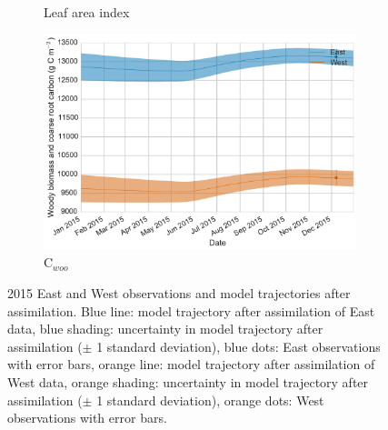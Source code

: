 \documentclass[11pt]{article}
\begin{document}
\begin{figure}[ht]
\begin{subfigure}[b]{0.49\textwidth}
        \caption{Leaf area index}
        \label{fig:lai}
    \end{subfigure}
    \begin{subfigure}[b]{0.49\textwidth}
        \includegraphics[width=\textwidth]{c_woo.pdf}
        \caption{C\(_{woo}\)}
        \label{fig:c_woo}
    \end{subfigure}
    \caption{2015 East and West observations and model trajectories after assimilation. Blue line: model trajectory after assimilation of East data, blue shading: uncertainty in model trajectory after assimilation (\(\pm\) 1 standard deviation), blue dots: East observations with error bars, orange line: model trajectory after assimilation of West data, orange shading: uncertainty in model trajectory after assimilation (\(\pm\) 1 standard deviation), orange dots: West observations with error bars.} \label{fig:nee_day}
\end{figure}
\end{document}
